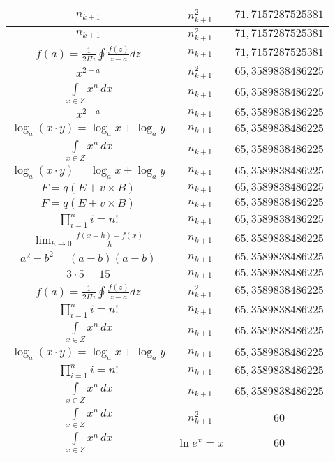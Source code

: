 \documentclass{article}
\begin{document}
\begin{flushleft}
\begin{longtable}{|c|c|c|}
$n_{k+1}$ & $n_{k+1}^2$ & $71,7157287525381$ \\ \hline 
$n_{k+1}$ & $n_{k+1}^2$ & $71,7157287525381$ \\ \hline 
$f\left(a\right)=\frac{1}{2\Pi i}\oint\frac{f\left(z\right)}{z-a}dz$ & $n_{k+1}$ & $71,7157287525381$ \\ \hline 
$x^{2+a}$ & $n_{k+1}^2$ & $65,3589838486225$ \\ \hline 
$\int \limits_{x\in Z}\!x^{n}\,dx$ & $n_{k+1}$ & $65,3589838486225$ \\ \hline 
$x^{2+a}$ & $n_{k+1}$ & $65,3589838486225$ \\ \hline 
$\log_{a}(x\cdot y)=\log_{a}x+\log_{a}y$ & $n_{k+1}$ & $65,3589838486225$ \\ \hline 
$\int \limits_{x\in Z}\!x^{n}\,dx$ & $n_{k+1}$ & $65,3589838486225$ \\ \hline 
$\log_{a}(x\cdot y)=\log_{a}x+\log_{a}y$ & $n_{k+1}$ & $65,3589838486225$ \\ \hline 
$F=q\left(E+v\times B\right)$ & $n_{k+1}$ & $65,3589838486225$ \\ \hline 
$F=q\left(E+v\times B\right)$ & $n_{k+1}$ & $65,3589838486225$ \\ \hline 
$\prod_{i=1}^ni=n!$ & $n_{k+1}$ & $65,3589838486225$ \\ \hline 
$\lim_{h\to0}\frac{f(x+h)-f(x)}{h}$ & $n_{k+1}$ & $65,3589838486225$ \\ \hline 
$a^2-b^2=(a-b)(a+b)$ & $n_{k+1}$ & $65,3589838486225$ \\ \hline 
$3\cdot 5=15$ & $n_{k+1}$ & $65,3589838486225$ \\ \hline 
$f\left(a\right)=\frac{1}{2\Pi i}\oint\frac{f\left(z\right)}{z-a}dz$ & $n_{k+1}^2$ & $65,3589838486225$ \\ \hline 
$\prod_{i=1}^ni=n!$ & $n_{k+1}$ & $65,3589838486225$ \\ \hline 
$\int \limits_{x\in Z}\!x^{n}\,dx$ & $n_{k+1}$ & $65,3589838486225$ \\ \hline 
$\log_{a}(x\cdot y)=\log_{a}x+\log_{a}y$ & $n_{k+1}$ & $65,3589838486225$ \\ \hline 
$\prod_{i=1}^ni=n!$ & $n_{k+1}$ & $65,3589838486225$ \\ \hline 
$\int \limits_{x\in Z}\!x^{n}\,dx$ & $n_{k+1}$ & $65,3589838486225$ \\ \hline 
$\int \limits_{x\in Z}\!x^{n}\,dx$ & $n_{k+1}^2$ & $60$ \\ \hline 
$\int \limits_{x\in Z}\!x^{n}\,dx$ & $\ln e^x=x$ & $60$ \\ \hline 

\end{longtable}
\end{flushleft}
\end{document}
